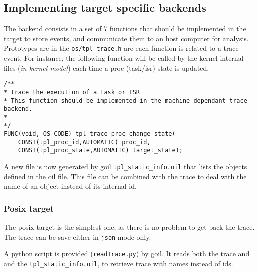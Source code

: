 \subsection{Implementing target specific backends}
\label{sec:trace:targetbackend}

The backend consists in a set of 7 functions that should be implemented in the target to store events, and communicate them to an host computer for analysis. Prototypes are in the \texttt{os/tpl_trace.h} are each function is related to a trace event. For instance, the following function will be called by the kernel internal files (\emph{in kernel mode!}) each time a proc (task/isr) state is updated.

\begin{lstlisting}
/**
* trace the execution of a task or ISR
* This function should be implemented in the machine dependant trace backend.
*
*/
FUNC(void, OS_CODE) tpl_trace_proc_change_state(
    CONST(tpl_proc_id,AUTOMATIC) proc_id,
    CONST(tpl_proc_state,AUTOMATIC) target_state);
\end{lstlisting}

A new file is now generated by goil \texttt{tpl_static_info.oil} that lists the objects defined in the oil file. This file can be combined with the trace to deal with the name of an object instead of its internal id.

\subsubsection{Posix target}
The posix target is the simplest one, as there is no problem to get back the trace. The trace can be save either in \texttt{json} mode only. 

A python script is provided (\texttt{readTrace.py}) by goil. It reads both the trace and and the \texttt{tpl_static_info.oil}, to retrieve trace with names instead of ids.

